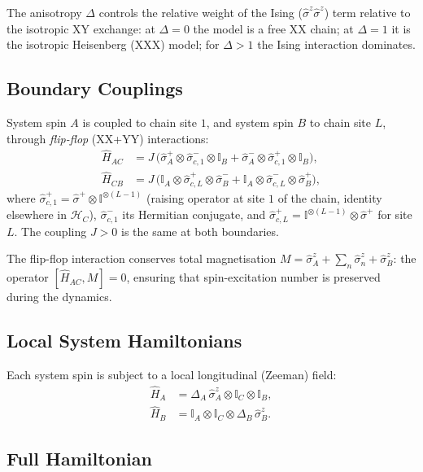 \documentclass[12pt,a4paper]{article}
\newcommand{\Ham}{\hat{H}}
\newcommand{\Hilb}{\mathcal{H}}
\newcommand{\sigz}{\hat{\sigma}^z}
\newcommand{\sigp}{\hat{\sigma}^+}
\newcommand{\sigm}{\hat{\sigma}^-}
\begin{document}
The anisotropy $\Delta$ controls the relative weight of the Ising ($\sigz\sigz$)
term relative to the isotropic XY exchange: at $\Delta=0$ the model is a free
XX chain; at $\Delta=1$ it is the isotropic Heisenberg (XXX) model; for
$\Delta>1$ the Ising interaction dominates.

\subsection{Boundary Couplings}
\label{subsec:coupling}

System spin $A$ is coupled to chain site $1$, and system spin $B$ to chain site
$L$, through \emph{flip-flop} (XX+YY) interactions:
\begin{align}
  \Ham_{AC} &= J\,\bigl(
    \sigp_A \otimes \sigm_{c,1} \otimes \mathbb{I}_B
    + \sigm_A \otimes \sigp_{c,1} \otimes \mathbb{I}_B
  \bigr), \label{eq:HAC}\\[4pt]
  \Ham_{CB} &= J\,\bigl(
    \mathbb{I}_A \otimes \sigp_{c,L} \otimes \sigm_B
    + \mathbb{I}_A \otimes \sigm_{c,L} \otimes \sigp_B
  \bigr), \label{eq:HCB}
\end{align}
where $\sigp_{c,1} = \sigp\otimes\mathbb{I}^{\otimes(L-1)}$ (raising operator at site
$1$ of the chain, identity elsewhere in $\Hilb_C$), $\sigm_{c,1}$ its
Hermitian conjugate, and $\sigp_{c,L} = \mathbb{I}^{\otimes(L-1)}\otimes\sigp$ for
site $L$.  The coupling $J > 0$ is the same at both boundaries.

The flip-flop interaction conserves total magnetisation
$M = \sigz_A + \sum_n\sigz_n + \sigz_B$: the operator $[\Ham_{AC}, M] = 0$,
ensuring that spin-excitation number is preserved during the dynamics.

\subsection{Local System Hamiltonians}
\label{subsec:local}

Each system spin is subject to a local longitudinal (Zeeman) field:
\begin{align}
  \Ham_A &= \Delta_A\,\sigz_A \otimes \mathbb{I}_C \otimes \mathbb{I}_B, \label{eq:HA}\\
  \Ham_B &= \mathbb{I}_A \otimes \mathbb{I}_C \otimes \Delta_B\,\sigz_B. \label{eq:HB}
\end{align}

\subsection{Full Hamiltonian}
\label{subsec:fullH}
\end{document}
